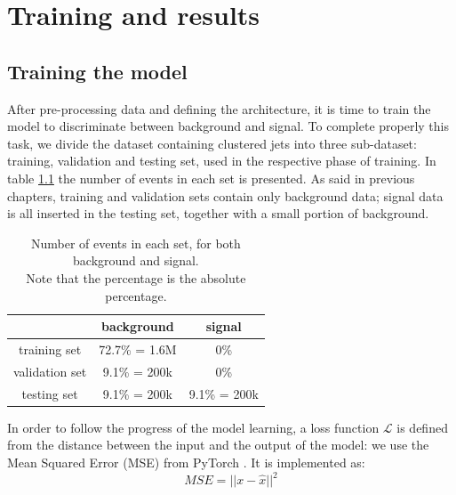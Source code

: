 \chapter{Training and results}\label{chap:Results}
\section{Training the model}\label{sec:training}
After pre-processing data and defining the architecture, it is time to train the model to discriminate between background and signal. To complete properly this task, we divide the dataset containing clustered jets into three sub-dataset: training, validation and testing set, used in the respective phase of training. In table \ref{tab:datasetPortion} the number of events in each set is presented. As said in previous chapters, training and validation sets contain only background data; signal data is all inserted in the testing set, together with a small portion of background.

\begin{table}[h!]
    \centering
    \begin{tabular}{|c||c|c|}
         \hline
         \rowcolor{lightgray}
         & background & signal \\
         \hline\hline
        training set & 72.7\% = 1.6M & 0\% \\
         \hline
        validation set & 9.1\% = 200k & 0\%  \\
         \hline
        testing set & 9.1\% = 200k & 9.1\% = 200k  \\
         \hline
    \end{tabular}
    \caption{Number of events in each set, for both background and signal.\\ Note that the percentage is the absolute percentage.}
    \label{tab:datasetPortion}
\end{table}

\noindent In order to follow the progress of the model learning, a loss function $\mathcal{L}$ is defined from the distance between the input and the output of the model: we use the Mean Squared Error (MSE) from PyTorch \cite{MSELoss}. It is implemented as:
\begin{equation}\label{eq:MSELoss}
    MSE = ||x -\hat{x}||^2
\end{equation}

